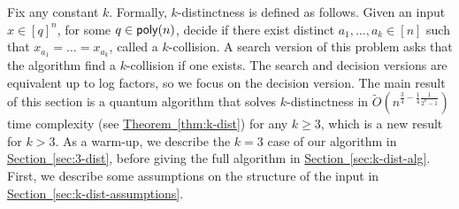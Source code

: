 \documentclass{theoretics}
\renewcommand{\sec}[1]{\hyperref[sec:#1]{Section~\ref*{sec:#1}}}
\newcommand{\thm}[1]{\hyperref[thm:#1]{Theorem~\ref*{thm:#1}}}
\renewcommand{\>}{\rangle}
\newcommand{\<}{\langle}
\renewcommand{\(}{\left(}
\renewcommand{\)}{\right)}
\begin{document}
Fix any constant $k$. Formally, $k$-distinctness is defined as follows. Given an input $x\in [q]^n$, for some $q\in {\sf poly}(n)$, decide if there exist distinct $a_1,\dots,a_k\in [n]$ such that $x_{a_1}=\dots=x_{a_k}$, called a $k$-collision. A search version of this problem asks that the algorithm find a $k$-collision if one exists. The search and decision versions are equivalent up to log factors, so we focus on the decision version. The main result of this section is a quantum algorithm that solves $k$-distinctness in $\widetilde{O}(n^{\frac{3}{4}-\frac{1}{4}\frac{1}{2^k-1}})$ time complexity (see \thm{k-dist}) for any $k\geq 3$, which is a new result for $k>3$. As a warm-up, we describe the $k=3$ case of our algorithm in \sec{3-dist}, before giving the full algorithm in \sec{k-dist-alg}. First, we describe some assumptions on the structure of the input in \sec{k-dist-assumptions}. 
\end{document}
